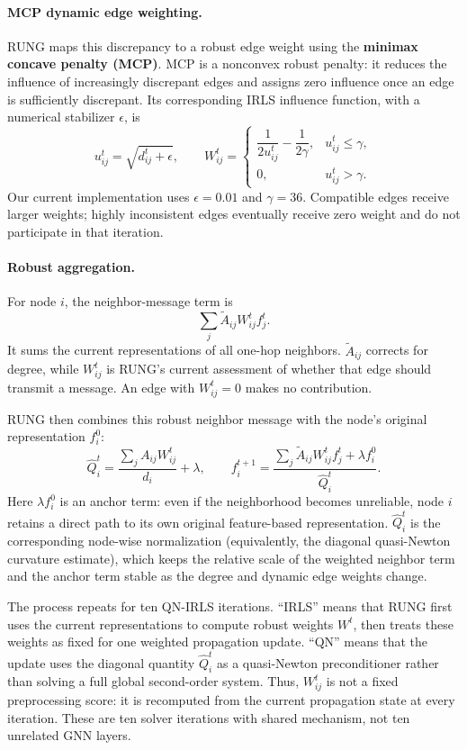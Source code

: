 \documentclass{article}
\begin{document}
\paragraph{MCP dynamic edge weighting.}
RUNG maps this discrepancy to a robust edge weight using the \textbf{minimax
concave penalty (MCP)}. MCP is a nonconvex robust penalty: it reduces the
influence of increasingly discrepant edges and assigns zero influence once an
edge is sufficiently discrepant. Its corresponding IRLS influence function,
with a numerical stabilizer $\epsilon$, is
\[
u_{ij}^t = \sqrt{d_{ij}^t + \epsilon},
\qquad
W_{ij}^t =
\begin{cases}
\dfrac{1}{2u_{ij}^t} - \dfrac{1}{2\gamma}, & u_{ij}^t \leq \gamma,\\[4pt]
0, & u_{ij}^t > \gamma.
\end{cases}
\]
Our current implementation uses $\epsilon=0.01$ and $\gamma=36$. Compatible
edges receive larger weights; highly inconsistent edges eventually receive zero
weight and do not participate in that iteration.

\paragraph{Robust aggregation.}
For node $i$, the neighbor-message term is
\[
\sum_j \widetilde A_{ij}W_{ij}^t f_j^t.
\]
It sums the current representations of all one-hop neighbors. $\widetilde
A_{ij}$ corrects for degree, while $W_{ij}^t$ is RUNG's current assessment of
whether that edge should transmit a message. An edge with $W_{ij}^t=0$ makes
no contribution.

RUNG then combines this robust neighbor message with the node's original
representation $f_i^0$:
\[
\widehat Q_i^t = \frac{\sum_j A_{ij}W_{ij}^t}{d_i} + \lambda,
\qquad
f_i^{t+1} =
\frac{\sum_j \widetilde A_{ij}W_{ij}^t f_j^t + \lambda f_i^0}
{\widehat Q_i^t}.
\]
Here $\lambda f_i^0$ is an anchor term: even if the neighborhood becomes
unreliable, node $i$ retains a direct path to its own original feature-based
representation. $\widehat Q_i^t$ is the corresponding node-wise
normalization (equivalently, the diagonal quasi-Newton curvature estimate),
which keeps the relative scale of the weighted neighbor term and the anchor
term stable as the degree and dynamic edge weights change.

The process repeats for ten QN-IRLS iterations. ``IRLS'' means that RUNG first
uses the current representations to compute robust weights $W^t$, then treats
these weights as fixed for one weighted propagation update. ``QN'' means that
the update uses the diagonal quantity $\widehat Q_i^t$ as a quasi-Newton
preconditioner rather than solving a full global second-order system. Thus,
$W_{ij}^t$ is not a fixed preprocessing score: it is recomputed from the
current propagation state at every iteration. These are ten solver iterations
with shared mechanism, not ten unrelated GNN layers.
\end{document}
